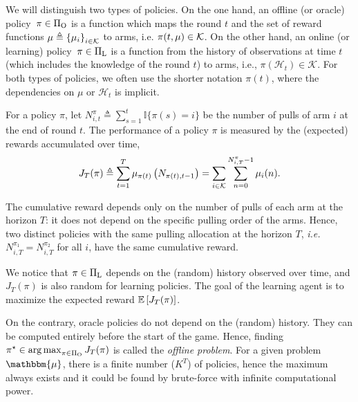 We will distinguish two types of policies. On the one hand, an offline (or oracle) policy~$\pi \in \Pi_{\rm O}$ is a function which maps the round $t$ and the set of reward functions $\mu \triangleq \left\{ \mu_i \right\}_{i \in \mathcal{K}}$ to arms, i.e. $\pi(t, \mu) \in \mathcal{K}$.  On the other hand, an online (or learning) policy~$\pi \in \Pi_{\rm L}$ is a function from the history of observations at time $t$ (which includes the knowledge of the round $t$) to arms, i.e., $\pi(\mathcal{H}_t) \in \mathcal{K}$. For both types of policies, we often use the shorter notation $\pi(t)$, where the dependencies on $\mu$ or $\mathcal{H}_t$ is implicit. 

For a policy $\pi$, let $N_{i,t}^\pi \triangleq \sum_{s=1}^{t} \mathbb{I}\{\pi(s) = i\}$ be the number of pulls of arm $i$ at the end of round $t$. The performance of a policy $\pi$ is measured by the (expected) rewards accumulated over time, 
%
\begin{equation}
\label{eq:cumul-reward-rested}
J_T(\pi) \triangleq \sum_{t=1}^T \mu_{\pi(t)}\left(N_{\pi(t),t-1}\right) = \sum_{i \in \mathcal{K}} \sum_{n=0}^{N_{i,T}^\pi-1} \mu_i(n).
\end{equation}
%
\begin{remark}
The cumulative reward depends only on the number of pulls of each arm at the horizon $T$: it does not depend on the specific pulling order of the arms. Hence, two distinct policies with the same pulling allocation at the horizon $T$, \emph{i.e.} $N_{i,T}^{\pi_1} = N_{i,T}^{\pi_2}$ for all $i$, have the same cumulative reward.
\end{remark}
%
We notice that $\pi \in \Pi_{\rm L}$ depends on the (random) history observed over time, and $J_T(\pi)$ is also random for learning policies. The goal of the learning agent is to maximize the expected reward $\mathbb{E}\left[J_T(\pi)\right]$.

On the contrary,  oracle policies do not depend on the (random) history. They can be computed entirely before the start of the game. Hence, finding $\pi^\star \in \operatorname*{arg\,max}_{\pi \in \Pi_{\rm O}} J_T(\pi)$ is called the \textit{offline problem}. For a given problem $\mathbbm{\mu}$, there is a finite number ($K^T$) of policies, hence the maximum always exists and it could be found by brute-force with infinite computational power.

